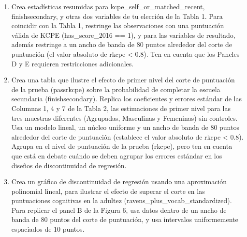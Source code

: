 \documentclass[11pt,a4paper,english]{article}
\begin{document}
\begin{enumerate}
    \item Crea estadísticas resumidas para kcpe\_self\_or\_matched\_recent, finishsecondary, y otras dos variables de tu elección de la Tabla 1. Para coincidir con la Tabla 1, restringe las observaciones con una puntuación válida de KCPE (has\_score\_2016 == 1), y para las variables de resultado, además restringe a un ancho de banda de 80 puntos alrededor del corte de puntuación (el valor absoluto de rkcpe < 0.8). Ten en cuenta que los Paneles D y E requieren restricciones adicionales.
    \item Crea una tabla que ilustre el efecto de primer nivel del corte de puntuación de la prueba (passrkcpe) sobre la probabilidad de completar la escuela secundaria (finishsecondary). Replica los coeficientes y errores estándar de las Columnas 1, 4 y 7 de la Tabla 2, las estimaciones de primer nivel para las tres muestras diferentes (Agrupadas, Masculinas y Femeninas) sin controles. Usa un modelo lineal, un núcleo uniforme y un ancho de banda de 80 puntos alrededor del corte de puntuación (establece el valor absoluto de rkcpe < 0.8). Agrupa en el nivel de puntuación de la prueba (rkcpe), pero ten en cuenta que está en debate cuándo se deben agrupar los errores estándar en los diseños de discontinuidad de regresión.
    \item Crea un gráfico de discontinuidad de regresión usando una aproximación polinomial lineal, para ilustrar el efecto de superar el corte en las puntuaciones cognitivas en la adultez (ravens\_plus\_vocab\_standardized). Para replicar el panel B de la Figura 6, usa datos dentro de un ancho de banda de 80 puntos del corte de puntuación, y usa intervalos uniformemente espaciados de 10 puntos.
\end{enumerate}
\end{document}
